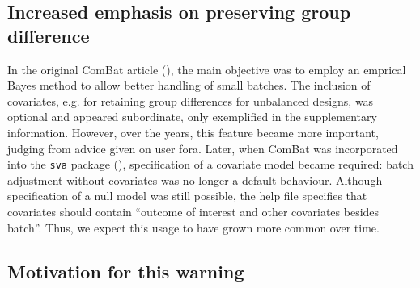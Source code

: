 \documentclass{bio}
\begin{document}
\subsection{Increased emphasis on preserving group difference}

In the original ComBat article (\citealp{Johnson2007}), the main objective was to employ an emprical Bayes method to allow better handling of small batches. The inclusion of covariates, e.g. for retaining group differences for unbalanced designs, was optional and appeared subordinate, only exemplified in the supplementary information. However, over the years, this feature became more important, judging from advice given on user fora.
Later, when ComBat was incorporated into the \texttt{sva} package (\citealp{Leek2012}), specification of a covariate model became required: batch adjustment without covariates was no longer a default behaviour. Although specification of a null model was still possible, the help file specifies that covariates should contain ``outcome of interest and other covariates besides batch''. Thus, we expect this usage to have grown more common over time.

\subsection{Motivation for this warning}
\end{document}
